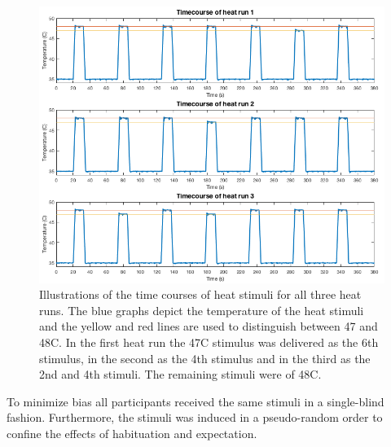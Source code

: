 \begin{figure}[H]                 
	\includegraphics[width=.95\textwidth]{figures/bMethods/Stim_design} 
	 \caption{Illustrations of the time courses of heat stimuli for all three heat runs. The blue graphs depict the temperature of the heat stimuli and the yellow and red lines are used to distinguish between 47 and 48\degree C. In the first heat run the 47\degree C stimulus was delivered as the 6th stimulus, in the second as the 4th stimulus and in the third as the 2nd and 4th stimuli. The remaining stimuli were of 48\degree C.}
	\label{fig:meth:stimdesign} 
\end{figure}

To minimize bias all participants received the same stimuli in a single-blind fashion. Furthermore, the stimuli was induced in a pseudo-random order to confine the effects of habituation and expectation. 
